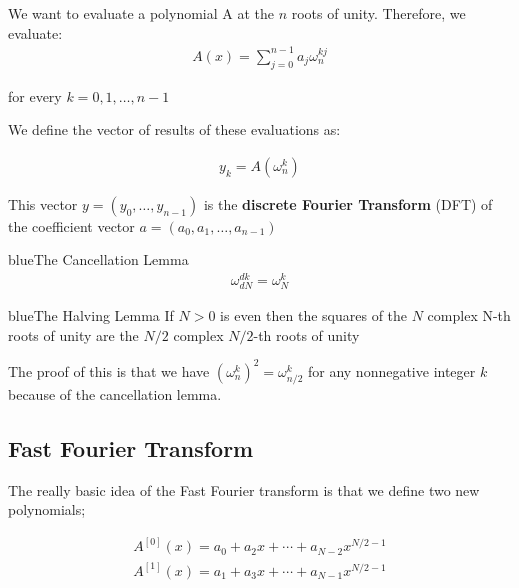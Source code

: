 \documentclass[11pt,a4paper,titlepage,dvipsnames,cmyk]{scrartcl}
\begin{document}
We want to evaluate a polynomial A at the $n$ roots of unity. Therefore,
we evaluate:
\begin{align*}
    A(x) = \sum_{j=0}^{n-1}a_j \omega_n^{kj}
\end{align*}

for every $k = 0,1,\dots, n-1$

We define the vector of results of these evaluations as:

\begin{align*}
    y_k = A(\omega^k_n)
\end{align*}

This vector $y = (y_0, \dots, y_{n-1})$ is the \textbf{discrete Fourier
Transform} (DFT) of the coefficient vector $a = (a_0, a_1, \dots, a_{n-1})$

\begin{titlebox}{blue}{The Cancellation Lemma}
\begin{align*}
    \omega^{dk}_{dN} = \omega^{k}_{N}
\end{align*}
\end{titlebox}

\begin{titlebox}{blue}{The Halving Lemma}
    If $N > 0$ is even then the squares of the $N$ complex N-th roots of
    unity are the $N/2$ complex $N/2$-th roots of unity

    The proof of this is that we have $(\omega^k_n) ^2 = \omega^k_{n/2}$
    for any nonnegative integer $k$ because of the cancellation lemma.
\end{titlebox}

\subsection{Fast Fourier Transform}%
\label{sub:fft}
The really basic idea of the Fast Fourier transform is that we define two
new polynomials;

\begin{align*}
    A^{[0]}(x) = a_0 + a_2x + \cdots + a_{N-2}x^{N/2 - 1} \\
    A^{[1]}(x) = a_1 + a_3x + \cdots + a_{N-1}x^{N/2 - 1}
\end{align*}
\end{document}
